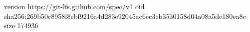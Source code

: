 version https://git-lfs.github.com/spec/v1
oid sha256:269b50c8958f8ebf9216a4d283e92045ac6ec3eb3530158d04a08a5de180ea8e
size 174936
